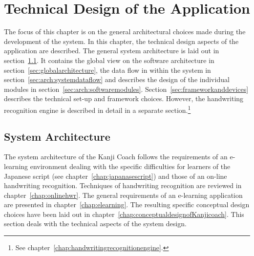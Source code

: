 
\chapter{Technical Design of the Application}
\label{chap:technicaldesign}




The focus of this chapter is on the general architectural choices made during
the development of the system. In this chapter, the technical design aspects 
of the application are described. The general system architecture is laid out in
section~\ref{sec:systemarchitecture}. It contains the global view on the software
architecture in section~\ref{sec:globalarchitecture}, the data flow in within
the system in section~\ref{sec:arch:systemdataflow} and describes the design
of the individual modules in section~\ref{sec:arch:softwaremodules}.
Section~\ref{sec:frameworkanddevices} describes the technical set-up and 
framework choices. However, the handwriting recognition engine is described 
in detail in a separate 
section.\footnote{See chapter~\ref{chap:handwritingrecognitionengine}.}

\section{System Architecture}
\label{sec:systemarchitecture}

The system architecture of the Kanji Coach follows the requirements of an 
e-learning environment dealing with the specific difficulties for learners 
of the Japanese script (see chapter~\ref{chap:japanasescript}) and those of an 
on-line handwriting recognition. Techniques of handwriting recognition are 
reviewed in chapter~\ref{chap:onlinehwr}. The general requirements of an 
e-learning application are presented in chapter~\ref{chap:elearning}. 
The resulting specific conceptual design choices have been 
laid out in chapter~\ref{chap:conceptualdesignofKanjicoach}. This
section deals with the technical aspects of the system design.

